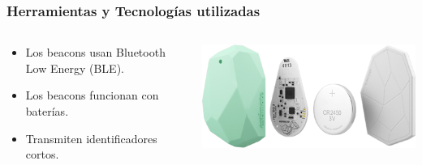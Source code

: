 \begin{frame}
	\frametitle{Herramientas y Tecnologías utilizadas}
		\begin{columns}
			\begin{column}{0.6\textwidth}
					\begin{itemize}
						\item {Los beacons usan Bluetooth Low Energy (BLE).}
						\item {Los beacons funcionan con baterías.}
						\item {Transmiten identificadores cortos.}
					\end{itemize}
				\endblock{}
			\end{column}
			\begin{column}{0.4\textwidth}
				\vfill 
					\begin{center}
						\includegraphics[width=0.8\linewidth]{Images/estimoteBeaconInside}
					\end{center}
			\end{column}
		\end{columns}
\end{frame}		
		


